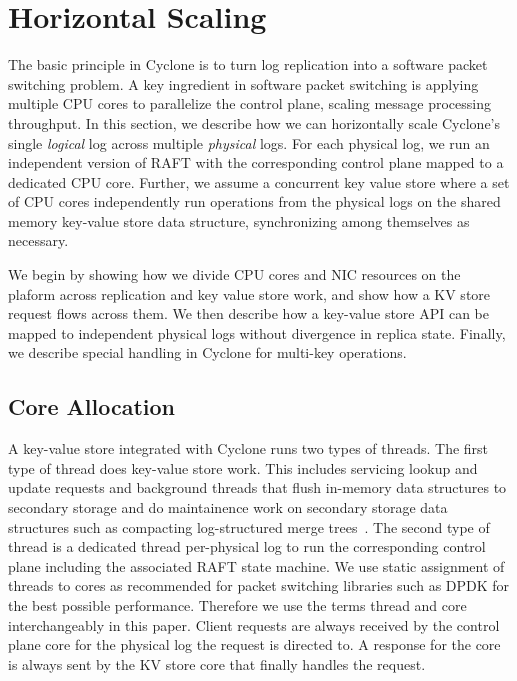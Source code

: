 \documentclass[pageno]{jpaper}
\begin{document}
\section{Horizontal Scaling}
\label{sec:horizontal}
The basic principle in Cyclone is to turn log replication into a software packet
switching problem. A key ingredient in software packet switching is applying
multiple CPU cores to parallelize the control plane, scaling message processing
throughput. In this section, we describe how we can horizontally scale Cyclone's
single \emph{logical} log across multiple \emph{physical} logs. For each
physical log, we run an independent version of RAFT with the corresponding
control plane mapped to a dedicated CPU core. Further, we assume a concurrent
key value store where a set of CPU cores independently run operations from the
physical logs on the shared memory key-value store data structure, synchronizing
among themselves as necessary.

We begin by showing how we divide CPU cores and NIC resources on the plaform across
replication and key value store work, and show how a KV store request flows
across them.  We then describe how a key-value store API can be mapped to
independent physical logs without divergence in replica state. Finally, we
describe special handling in Cyclone for multi-key operations.

\subsection{Core Allocation}
A key-value store integrated with Cyclone runs two types of threads. The first
type of thread does key-value store work. This includes servicing lookup and
update requests and background threads that flush in-memory data structures to
secondary storage and do maintainence work on secondary storage data structures
such as compacting log-structured merge trees~\cite{lsmtree}. The second type of
thread is a dedicated thread per-physical log to run the corresponding control
plane including the associated RAFT state machine. We use static assignment of
threads to cores as recommended for packet switching libraries such as DPDK for
the best possible performance. Therefore we use the terms thread and core
interchangeably in this paper. Client requests are always received by the
control plane core for the physical log the request is directed to. A response
for the core is always sent by the KV store core that finally handles the
request.
\end{document}
